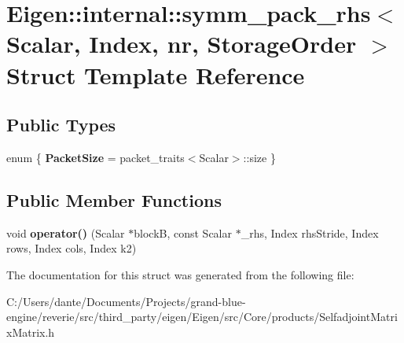 \hypertarget{struct_eigen_1_1internal_1_1symm__pack__rhs}{}\section{Eigen\+::internal\+::symm\+\_\+pack\+\_\+rhs$<$ Scalar, Index, nr, Storage\+Order $>$ Struct Template Reference}
\label{struct_eigen_1_1internal_1_1symm__pack__rhs}
\subsection*{Public Types}
\begin{DoxyCompactItemize}
\item 
\mbox{\label{struct_eigen_1_1internal_1_1symm__pack__rhs_a15d8707fd2032ef061b9c0a7e025047b}} 
enum \{ {\bfseries Packet\+Size} = packet\+\_\+traits$<$Scalar$>$\+::size
 \}
\end{DoxyCompactItemize}
\subsection*{Public Member Functions}
\begin{DoxyCompactItemize}
\item 
\mbox{\label{struct_eigen_1_1internal_1_1symm__pack__rhs_a8cd8d2fe9b65b3836495e781d907cfeb}} 
void {\bfseries operator()} (Scalar $\ast$blockB, const Scalar $\ast$\+\_\+rhs, Index rhs\+Stride, Index rows, Index cols, Index k2)
\end{DoxyCompactItemize}


The documentation for this struct was generated from the following file\+:\begin{DoxyCompactItemize}
\item 
C\+:/\+Users/dante/\+Documents/\+Projects/grand-\/blue-\/engine/reverie/src/third\+\_\+party/eigen/\+Eigen/src/\+Core/products/Selfadjoint\+Matrix\+Matrix.\+h\end{DoxyCompactItemize}

